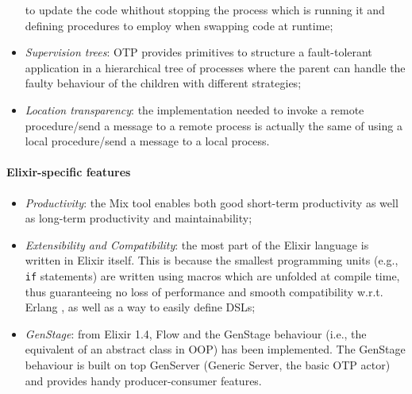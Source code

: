 \begin{itemize}
        to update the code whithout stopping the process which is running it
        and defining procedures to employ when swapping code at runtime;
    \item \textit{Supervision trees}: OTP provides primitives to structure a
        fault-tolerant application in a hierarchical tree of processes where
        the parent can handle the faulty behaviour of the children with
        different strategies;
    \item \textit{Location transparency}: the implementation needed to invoke a
        remote procedure/send a message to a remote process is actually the same
        of using a local procedure/send a message to a local process.
\end{itemize}

\paragraph{Elixir-specific features}
\begin{itemize}
  \item \textit{Productivity}: the Mix tool enables both good short-term
        productivity as well as long-term productivity and maintainability;
  \item \textit{Extensibility and Compatibility}: the most part of the Elixir
        language is written in Elixir itself. This is because the smallest
        programming units (e.g., \texttt{if} statements) are written using
        macros which are unfolded at compile time, thus guaranteeing no loss of
        performance and smooth compatibility w.r.t. Erlang , as well as a way
        to easily define DSLs;
  \item \textit{GenStage}: from Elixir 1.4, Flow and the GenStage behaviour
        (i.e., the equivalent of an abstract class in OOP) has been implemented.
        The GenStage behaviour is built on top GenServer (Generic
        Server, the basic OTP actor) and provides handy producer-consumer
        features.
\end{itemize}
